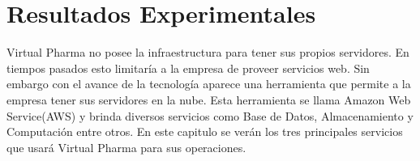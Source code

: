 \section*{Resultados Experimentales}\label{sec:Resultados Experimentales}
Virtual Pharma no posee la infraestructura para tener sus propios servidores. En tiempos pasados esto limitaría a la empresa de proveer servicios web. Sin embargo con el avance de la tecnología aparece una herramienta que permite a la empresa tener sus servidores en la nube. Esta herramienta se llama Amazon Web Service(AWS) y brinda diversos servicios como Base de Datos, Almacenamiento y Computación entre otros. En este capitulo se verán los tres principales servicios que usará Virtual Pharma para sus operaciones.